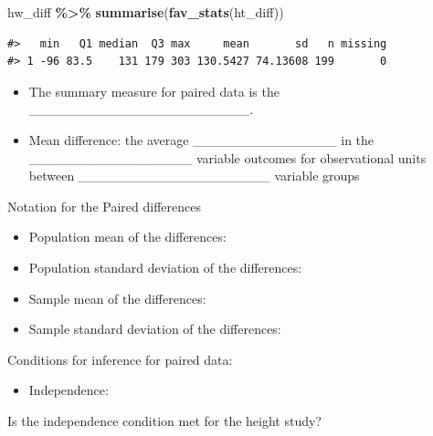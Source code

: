 \documentclass[
]{report}
\newenvironment{Shaded}{\begin{snugshade}}{\end{snugshade}}
\newcommand{\FunctionTok}[1]{\textcolor[rgb]{0.13,0.29,0.53}{\textbf{#1}}}
\newcommand{\NormalTok}[1]{#1}
\newcommand{\SpecialCharTok}[1]{\textcolor[rgb]{0.81,0.36,0.00}{\textbf{#1}}}
\providecommand{\tightlist}{%
  \setlength{\itemsep}{0pt}\setlength{\parskip}{0pt}}
\begin{document}
\begin{Shaded}
\begin{Highlighting}[]
\NormalTok{hw\_diff }\SpecialCharTok{\%\textgreater{}\%}
    \FunctionTok{summarise}\NormalTok{(}\FunctionTok{fav\_stats}\NormalTok{(ht\_diff))}
\end{Highlighting}
\end{Shaded}

\begin{verbatim}
#>   min   Q1 median  Q3 max     mean       sd   n missing
#> 1 -96 83.5    131 179 303 130.5427 74.13608 199       0
\end{verbatim}


\begin{itemize}
\tightlist
\item
  The summary measure for paired data is the \_\_\_\_\_\_\_\_\_\_\_\_\_\_\_\_\_\_\_\_\_\_\_.
\end{itemize}

\newpage

\begin{itemize}
\tightlist
\item
  Mean difference: the average \_\_\_\_\_\_\_\_\_\_\_\_\_\_\_ in the \_\_\_\_\_\_\_\_\_\_\_\_\_\_\_\_\_
  variable outcomes for observational units between \_\_\_\_\_\_\_\_\_\_\_\_\_\_\_\_\_\_\_\_ variable groups
\end{itemize}


Notation for the Paired differences

\begin{itemize}
\item
  Population mean of the differences:
\item
  Population standard deviation of the differences:
\item
  Sample mean of the differences:
\item
  Sample standard deviation of the differences:
\end{itemize}

Conditions for inference for paired data:

\begin{itemize}
\tightlist
\item
  Independence:
\end{itemize}

\vspace{0.5in}

Is the independence condition met for the height study?
\end{document}
